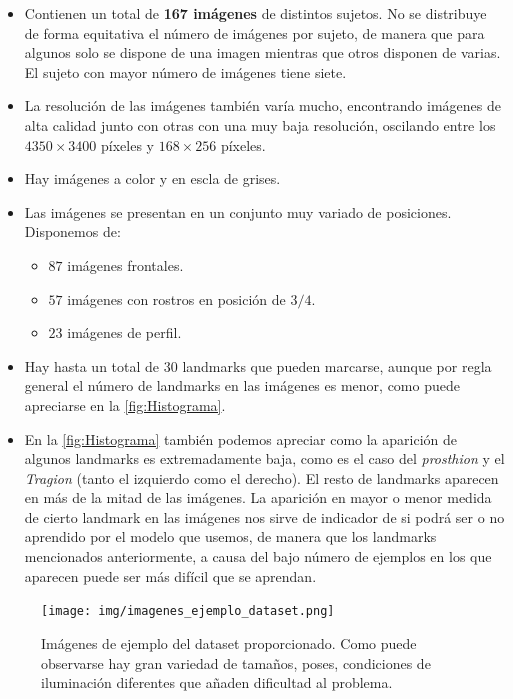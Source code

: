         \begin{itemize}
            \item Contienen un total de \textbf{167 imágenes} de distintos sujetos. No se distribuye de forma equitativa el número de imágenes por sujeto, de manera que para algunos solo se dispone de una imagen mientras que otros disponen de varias. El sujeto con mayor número de imágenes tiene siete.
            \item La resolución de las imágenes también varía mucho, encontrando imágenes de alta calidad junto con otras con una muy baja resolución, oscilando entre los $4350 \times 3400$ píxeles y $168 \times 256$ píxeles.
            \item Hay imágenes a color y en escla de grises.
            \item Las imágenes se presentan en un conjunto muy variado de posiciones. Disponemos de: 
            \begin{itemize}
                \item $87$ imágenes frontales.
                \item $57$ imágenes con rostros en posición de $3/4$.
                \item $23$ imágenes de perfil.
            \end{itemize}
            \item Hay hasta un total de $30$ landmarks que pueden marcarse, aunque por regla general el número de landmarks en las imágenes es menor, como puede apreciarse en la \autoref{fig:Histograma}.
            \item En la \autoref{fig:Histograma} también podemos apreciar como la aparición de algunos landmarks es extremadamente baja, como es el caso del \textit{prosthion} y el \textit{Tragion} (tanto el izquierdo como el derecho). El resto de landmarks aparecen en más de la mitad de las imágenes. 
            \medskip
            \noindent La aparición en mayor o menor medida de cierto landmark en las imágenes nos sirve de indicador de si podrá ser o no aprendido por el modelo que usemos, de manera que los landmarks mencionados anteriormente, a causa del bajo número de ejemplos en los que aparecen puede ser más difícil que se aprendan.
        \end{itemize}

            \begin{figure}[!h]
                \centering
                \texttt{[image: img/imagenes\_ejemplo\_dataset.png]}
                \caption{Imágenes de ejemplo del dataset proporcionado. Como puede observarse hay gran variedad de tamaños, poses, condiciones de iluminación diferentes que añaden dificultad al problema.}
                \label{fig:Imagenes_dataset}
            \end{figure}

